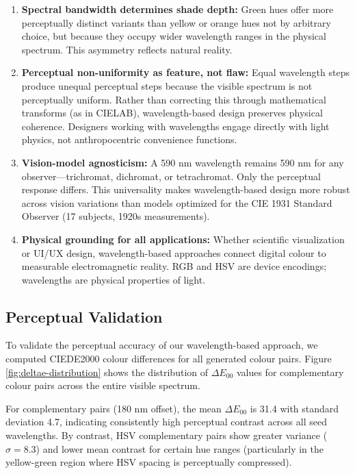\documentclass[12pt,a4paper]{article}
\newcommand{\deltaE}{\Delta E_{00}}
\begin{document}
\begin{enumerate}
\item \textbf{Spectral bandwidth determines shade depth:} Green hues offer more perceptually distinct variants than yellow or orange hues not by arbitrary choice, but because they occupy wider wavelength ranges in the physical spectrum. This asymmetry reflects natural reality.

\item \textbf{Perceptual non-uniformity as feature, not flaw:} Equal wavelength steps produce unequal perceptual steps because the visible spectrum is not perceptually uniform. Rather than correcting this through mathematical transforms (as in CIELAB), wavelength-based design preserves physical coherence. Designers working with wavelengths engage directly with light physics, not anthropocentric convenience functions.

\item \textbf{Vision-model agnosticism:} A 590 nm wavelength remains 590 nm for any observer—trichromat, dichromat, or tetrachromat. Only the perceptual response differs. This universality makes wavelength-based design more robust across vision variations than models optimized for the CIE 1931 Standard Observer (17 subjects, 1920s measurements).

\item \textbf{Physical grounding for all applications:} Whether scientific visualization or UI/UX design, wavelength-based approaches connect digital colour to measurable electromagnetic reality. RGB and HSV are device encodings; wavelengths are physical properties of light.
\end{enumerate}

\subsection{Perceptual Validation}

To validate the perceptual accuracy of our wavelength-based approach, we computed CIEDE2000 colour differences for all generated colour pairs. Figure \ref{fig:deltae-distribution} shows the distribution of $\deltaE$ values for complementary colour pairs across the entire visible spectrum.

For complementary pairs (180 nm offset), the mean $\deltaE$ is 31.4 with standard deviation 4.7, indicating consistently high perceptual contrast across all seed wavelengths. By contrast, HSV complementary pairs show greater variance ($\sigma = 8.3$) and lower mean contrast for certain hue ranges (particularly in the yellow-green region where HSV spacing is perceptually compressed).
\end{document}
